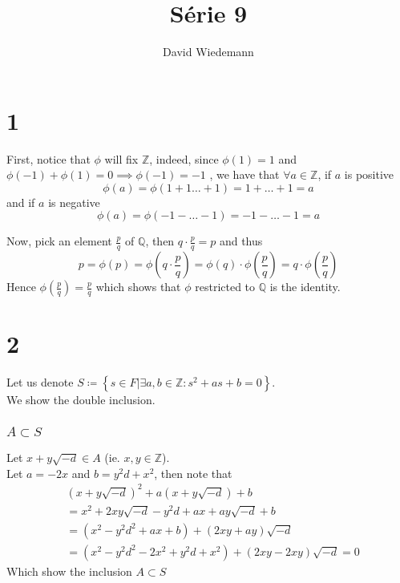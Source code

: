 \documentclass[11pt, a4paper]{article}
\begin{document}
\title{Série 9}
\author{David Wiedemann}
\maketitle
\section*{1}
First, notice that $\phi$ will fix $\mathbb{Z}$, indeed, since $ \phi( 1) =1$ and $\phi( -1)+ \phi( 1) = 0 \implies \phi(-1 )  = -1$ , we have that $\forall a \in \mathbb{Z}$, if $a$ is positive 
\[ 
\phi( a) = \phi( 1 + 1 \ldots + 1) = 1 + \ldots + 1 = a
\]
and if $a$ is negative
\[ 
\phi( a) = \phi( -1 - \ldots -1 ) = -1 - \ldots - 1 = a
\]

Now, pick an element $ \frac{p}{q}$ of $ \mathbb{Q}$, then $ q \cdot \frac{p}{q}= p$ and thus
\[ 
p = \phi( p) = \phi\left( q \cdot \frac{p}{q}\right) = \phi( q) \cdot \phi\left( \frac{p}{q}\right) = q \cdot\phi\left( \frac{p}{q}\right) 
\]
Hence $\phi( \frac{p}{q}) = \frac{p}{q}$ which shows that $\phi$ restricted to $\mathbb{Q}$ is the identity.
\section*{2}
Let us denote $ S \coloneqq \left\{ s \in F | \exists a,b \in \mathbb{Z} : s^{2} + as + b =0 \right\} $.\\
We show the double inclusion.
\subsubsection*{ $A \subset S$ }
Let $x + y \sqrt{ -d} \in A$ (ie. $x,y\in \mathbb{Z}$).\\
Let $a= -2x$ and $ b = y^{2}d+ x^{2}$, then note that
\begin{align*}
	&( x+ y \sqrt{-d} )^{2} + a ( x+y \sqrt{-d} ) + b \\
	&= x^{2} + 2xy \sqrt{-d} - y^{2} d + ax + ay \sqrt{-d} +b \\
	&= ( x^{2} - y^{2}d^{2} + ax +b  ) + ( 2xy + ay )  \sqrt{-d} \\
	&= ( x^{2} -y ^{2}d^{2} - 2x^{2} + y^{2} d + x^{2}) + ( 2xy - 2xy) \sqrt{-d} = 0
\end{align*}
Which show the inclusion $ A \subset S$ 
\end{document}

